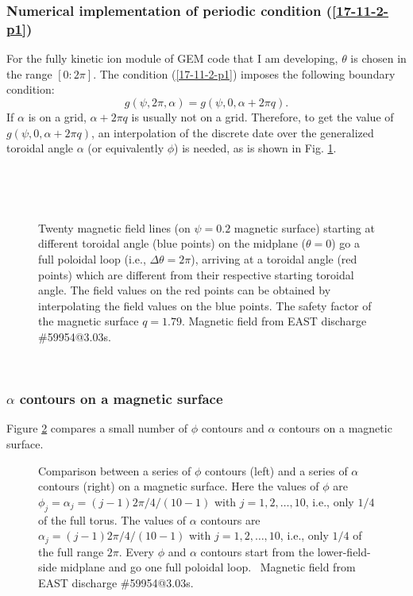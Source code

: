 \documentclass{article}
\begin{document}
\subsubsection{Numerical implementation of periodic condition
(\ref{17-11-2-p1})}

For the fully kinetic ion module of GEM code that I am developing, $\theta$ is
chosen in the range $[0 : 2 \pi]$. The condition (\ref{17-11-2-p1}) imposes
the following boundary condition:
\begin{equation}
  g (\psi, 2 \pi, \alpha) = g (\psi, 0, \alpha + 2 \pi q) .
\end{equation}
If $\alpha$ is on a grid, $\alpha + 2 \pi q$ is usually not on a grid.
Therefore, to get the value of $g (\psi, 0, \alpha + 2 \pi q)$, an
interpolation of the discrete date over the generalized toroidal angle
$\alpha$ (or equivalently $\phi$) is needed, as is shown in Fig.
\ref{17-11-2-1}.

\

\

\begin{figure}[h]
  \caption{\label{17-11-2-1}Twenty magnetic field lines (on $\psi = 0.2$
  magnetic surface) starting at different toroidal angle (blue points) on the
  midplane ($\theta = 0$) go a full poloidal loop (i.e., $\Delta \theta = 2
  \pi$), arriving at a toroidal angle (red points) which are different from
  their respective starting toroidal angle. The field values on the red points
  can be obtained by interpolating the field values on the blue points. The
  safety factor of the magnetic surface $q = 1.79$. Magnetic field from EAST
  discharge \#59954@3.03s.}
\end{figure}

\

\subsubsection{$\alpha$ contours on a magnetic surface}

Figure \ref{17-10-29-1} compares a small number of $\phi$ contours and
$\alpha$ contours on a magnetic surface.

\begin{figure}[h]
  \caption{\label{17-10-29-1}Comparison between a series of $\phi$ contours
  (left) and a series of $\alpha$ contours (right) on a magnetic surface. Here
  the values of $\phi$ are $\phi_j = \alpha_j = (j - 1) 2 \pi / 4 / (10 - 1)$
  with $j = 1, 2, \ldots, 10$, i.e., only $1 / 4$ of the full torus. The
  values of $\alpha$ contours are $\alpha_j = (j - 1) 2 \pi / 4 / (10 - 1)$
  with $j = 1, 2, \ldots, 10$, i.e., only $1 / 4$ of the full range $2 \pi$.
  Every $\phi$ and $\alpha$ contours start from the lower-field-side midplane
  and go one full poloidal loop. \ Magnetic field from EAST discharge
  \#59954@3.03s.}
\end{figure}
\end{document}
